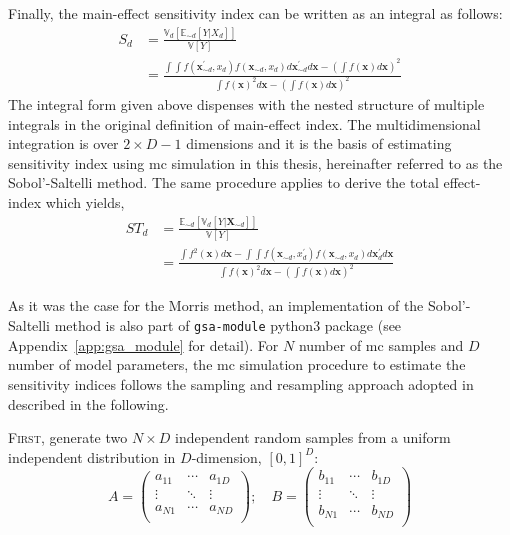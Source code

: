 Finally, the main-effect sensitivity index can be written as an integral as follows:
\begin{equation}
  \begin{split}
    S_d & = \frac{\mathbb{V}_d [\mathbb{E}_{\sim d} [Y|X_d]]}{\mathbb{V}[Y]} \\
        & = \frac{\int \int f(\mathbf{x}^{\prime}_{\sim d}, x_d) f(\mathbf{x}_{\sim d}, x_d) d\mathbf{x}^{\prime}_{\sim d} d\mathbf{x} - \left(\int f(\mathbf{x}) d\mathbf{x}\right)^2}{\int f(\mathbf{x})^2 d\mathbf{x} - \left( \int f(\mathbf{x}) d\mathbf{x}\right)^2}
  \end{split}
\label{eq:ss_main_effect_integral}
\end{equation}
The integral form given above dispenses with the nested structure of multiple integrals in the original definition of main-effect index.
The multidimensional integration is over $2 \times D - 1$ dimensions 
and it is the basis of estimating sensitivity index using \gls{mc} simulation in this thesis, hereinafter referred to as the Sobol'-Saltelli method.
The same procedure applies to derive the total effect-index which yields,
\begin{equation}
  \begin{split}
    ST_d & = \frac{\mathbb{E}_{\sim d}[\mathbb{V}_{d}[Y|\mathbf{X}_{\sim d}]]}{\mathbb{V}[Y]} \\
        & = \frac{\int f^2(\mathbf{x}) d\mathbf{x} - \int \int f(\mathbf{x}_{\sim d}, x^{\prime}_d) f(\mathbf{x}_{\sim d}, x_d) d\mathbf{x}^{\prime}_{d} d\mathbf{x}}{\int f(\mathbf{x})^2 d\mathbf{x} - \left( \int f(\mathbf{x}) d\mathbf{x}\right)^2}
  \end{split}
\label{eq:ss_total_effect_integral}
\end{equation}

As it was the case for the Morris method, an implementation of the Sobol'-Saltelli method is also part of \texttt{gsa-module} python3 package (see Appendix~\ref{app:gsa_module} for detail). 
For $N$ number of \gls{mc} samples and $D$ number of model parameters, the \gls{mc} simulation procedure to estimate the sensitivity indices follows the sampling and resampling approach adopted in~\cite{Sobol2001,Saltelli2002,Homma1996} described in the following.

\textsc{First}, generate two $N \times D$ independent random samples from a uniform independent distribution in $D$-dimension, $[0,1]^D$:
\begin{equation}
A = 
\begin{pmatrix}
a_{11}  & \cdots  & a_{1D}\\
\vdots	& \ddots & \vdots\\
a_{N1}  & \cdots  & a_{ND}\\
\end{pmatrix}
;\quad B = 
\begin{pmatrix}
b_{11}  & \cdots  & b_{1D}\\
\vdots	& \ddots & \vdots\\
b_{N1}  & \cdots  & b_{ND}\\
\end{pmatrix}
\label{eq:ss_two_samples}
\end{equation}

